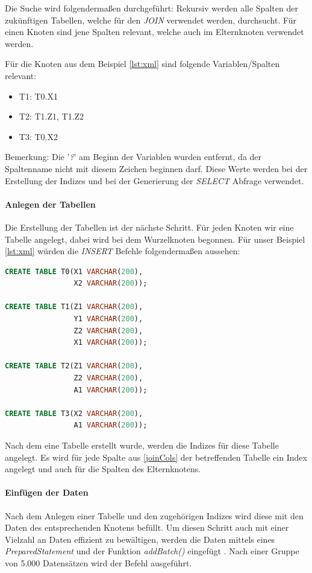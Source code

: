 \documentclass[draft,final]{vutinfth} %
\begin{document}
Die Suche wird folgenderma\ss en durchgeführt: Rekursiv werden alle Spalten der zukünftigen Tabellen, welche für den \textit{JOIN} verwendet werden, durchsucht. Für einen Knoten sind jene Spalten relevant, welche auch im Elternknoten verwendet werden. 

Für die Knoten aus dem Beispiel \ref{lst:xml} sind folgende Variablen/Spalten relevant:
\begin{itemize}
	\item T1: T0.X1
	\item T2: T1.Z1, T1.Z2
	\item T3: T0.X2
\end{itemize}
Bemerkung: Die '\textit{?}' am Beginn der Variablen wurden entfernt, da der Spaltenname nicht mit diesem Zeichen beginnen darf.
Diese Werte werden bei der Erstellung der Indizes und bei der Generierung der \textit{SELECT} Abfrage verwendet.

\paragraph{Anlegen der Tabellen}
Die Erstellung der Tabellen ist der nächste Schritt. Für jeden Knoten wir eine Tabelle angelegt, dabei wird bei dem Wurzelknoten begonnen. Für unser Beispiel \ref{lst:xml} würden die \textit{INSERT} Befehle folgenderma\ss en aussehen:

\begin{lstlisting}[language=SQL,caption={CREATE Befehle},frame = single]
CREATE TABLE T0(X1 VARCHAR(200), 
                X2 VARCHAR(200));

CREATE TABLE T1(Z1 VARCHAR(200), 
                Y1 VARCHAR(200), 
                Z2 VARCHAR(200), 
                X1 VARCHAR(200));

CREATE TABLE T2(Z1 VARCHAR(200), 
                Z2 VARCHAR(200), 
                A1 VARCHAR(200));

CREATE TABLE T3(X2 VARCHAR(200), 
                A1 VARCHAR(200));
\end{lstlisting}

Nach dem eine Tabelle erstellt wurde, werden die Indizes für diese Tabelle angelegt. Es wird für jede Spalte aus \ref{joinCols} der betreffenden Tabelle ein Index angelegt und auch für die Spalten des Elternknotens.

\paragraph{Einfügen der Daten}
Nach dem Anlegen einer Tabelle und den zugehörigen Indizes wird diese mit den Daten des entsprechenden Knotens befüllt. Um diesen Schritt auch mit einer Vielzahl an Daten effizient zu bewältigen, werden die Daten mittels eines \textit{PreparedStatement} und der Funktion \textit{addBatch()} eingefügt \cite{AddBatch}. Nach einer Gruppe von 5.000 Datensätzen wird der Befehl ausgeführt.
\end{document}
